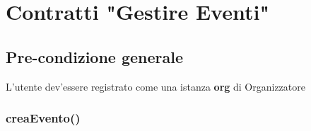 \documentclass[14pt]{extarticle}
\begin{document}
\section{Contratti "Gestire Eventi"}
\subsection{Pre-condizione generale}

L'utente dev'essere registrato come una istanza \textbf{org} di Organizzatore

\subsubsection{creaEvento()}
\end{document}
